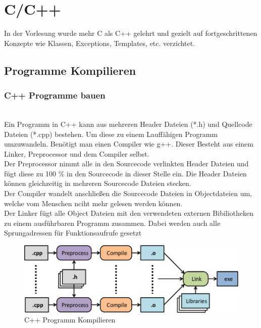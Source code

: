 \chapter{C/C++}
\label{sec:C/C++}
In der Vorlesung wurde mehr C als C++ gelehrt und gezielt auf fortgeschrittenen Konzepte wie Klassen, Exceptions, Templates, etc. verzichtet. 
\section{Programme Kompilieren}
\subsection{C++ Programme bauen}\qquad\\
Ein Programm in C++ kann aus mehreren Header Dateien (*.h) und Quellcode Dateien (*.cpp) bestehen. Um diese zu einem Lauffähigen Programm umzuwandeln. Benötigt man einen Compiler wie g++. Dieser Besteht aus einem Linker, Preprocessor und dem Compiler selbst. \\
Der Preprocessor nimmt alle in den Sourcecode verlinkten Header Dateien und fügt diese zu 100 \% in den Sourcecode in dieser Stelle ein. Die Header Dateien können gleichzeitig in mehreren Sourcecode Dateien stecken. \\
Der Compiler wandelt anschließen die Sourcecode Dateien in Objectdateien um, welche vom Menschen nciht mehr gelesen werden können.\\
Der Linker fügt alle Object Dateien mit den verwendeten externen Bibiliotheken zu einem ausführbaren Programm zusammen. Dabei werden auch alle Sprungadressen für Funktionsaufrufe gesetzt\\
\begin{figure}[h]
	\centering
	\includegraphics[width=0.75\linewidth]{mainmatter/pics/comp}
	\caption[compiling]{C++ Programm Kompilieren}
	\label{fig:comp}
\end{figure}
